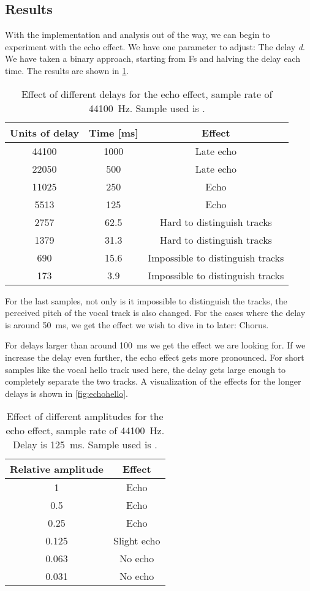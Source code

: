 
\subsection{Results}
With the implementation and analysis out of the way, we can begin to experiment with the echo effect. We have one parameter to adjust: The delay \emph{d}. We have taken a binary approach, starting from Fs and halving the delay each time. The results are shown in \cref{tbl:echo}.
\begin{table}[!hbt]
	\centering
	\begin{tabular}{ccc}
		\toprule
		Units of delay & Time [ms] & Effect \\ 
		\midrule
		44100 & 1000 & Late echo \\ 
		22050 & 500 & Late echo \\ 
		11025 & 250 & Echo \\ 
		5513 & 125 & Echo \\ 
		2757 & 62.5 & Hard to distinguish tracks \\ 
		1379 & 31.3 & Hard to distinguish tracks \\ 
		690 & 15.6 & Impossible to distinguish tracks \\ 
		173 & 3.9 & Impossible to distinguish tracks \\ 
		\bottomrule
	\end{tabular}
	\caption{Effect of different delays for the echo effect, sample rate of \SI{44100}{\hertz}. Sample used is \cite{audiohello}.}
	\label{tbl:echo}
\end{table}
For the last samples, not only is it impossible to distinguish the tracks, the perceived pitch of the vocal track is also changed. For the cases where the delay is around \SI{50}{\milli\second}, we get the effect we wish to dive in to later: Chorus.

For delays larger than around \SI{100}{\milli\second} we get the effect we are looking for. If we increase the delay even further, the echo effect gets more pronounced. For short samples like the vocal hello track used here, the delay gets large enough to completely separate the two tracks. A visualization of the effects for the longer delays is shown in \cref{fig:echohello}.

\begin{table}[!hbt]
	\centering
	\begin{tabular}{cc}
		\toprule
		Relative amplitude & Effect \\ 
		\midrule
		1 & Echo \\ 
		0.5 & Echo \\ 
		0.25 & Echo \\ 
		0.125 & Slight echo \\ 
		0.063 & No echo \\ 
		0.031 & No echo \\ 
		\bottomrule
	\end{tabular}
	\caption{Effect of different amplitudes for the echo effect, sample rate of \SI{44100}{\hertz}. Delay is \SI{125}{\milli\second}. Sample used is \cite{audiohello}.}
	\label{tbl:echoamp}
\end{table}

